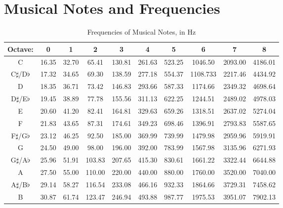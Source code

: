 \newpage

\section{Musical Notes and Frequencies}



\begin{center}

	
	\begin{table}[h]
		\caption{\label{tab:Frequencies}Frequencies of Musical Notes, in Hz}	
		\begin{tabular}{ |c | c | c | c | c | c | c | c | c |c|}
		
			\hline 
			\textbf{Octave:} & 0 & 1 & 2 &3&4&5&6&7&8 \\
			\hline 
			C & 16.35 & 32.70 & 65.41 & 130.81 & 261.63 & 523.25 & 1046.50 & 2093.00 & 4186.01 \\
			\hline
			C$\sharp$/D$\flat$& 17.32 & 34.65 & 69.30 & 138.59& 277.18 & 554.37 & 1108.733 & 2217.46 & 4434.92 \\
			\hline
			D & 18.35 & 36.71 & 73.42 & 146.83 & 293.66 & 587.33 & 1174.66 & 2349.32 & 4698.64 \\
			\hline
			D$\sharp$/E$\flat$& 19.45 &38.89 & 77.78& 155.56& 311.13& 622.25 & 1244.51& 2489.02& 4978.03 \\
			\hline
			E &	20.60&41.20&82.41&164.81&329.63&659.26&1318.51&2637.02&5274.04\\
			\hline
			F  & 21.83&	43.65&	87.31&	174.61&	349.23&	698.46&	1396.91&	2793.83& 5587.65 \\
			\hline
			F$\sharp$/G$\flat$& 23.12&	46.25&92.50& 185.00&369.99&	739.99&	1479.98&2959.96&5919.91 \\
			\hline
			G & 24.50&49.00&98.00&196.00&392.00&783.99&1567.98&3135.96&6271.93\\
			\hline
			G$\sharp$/A$\flat$& 25.96&51.91&103.83&207.65&415.30&830.61&1661.22&3322.44&6644.88\\
			\hline
			A &27.50&55.00&110.00&220.00&440.00&880.00&1760.00&3520.00&7040.00\\
			\hline
			A$\sharp$/B$\flat$ & 29.14&58.27&116.54&233.08&466.16&	932.33&1864.66&3729.31&7458.62\\
			\hline
			B& 30.87&61.74&123.47&246.94&493.88&987.77&1975.53&3951.07&7902.13\\
			\hline			
		\end{tabular}
	\end{table}
\end{center}



